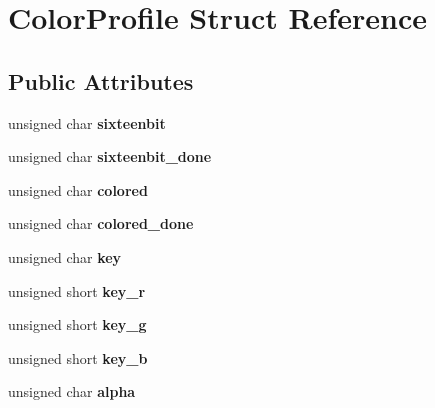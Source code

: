 \hypertarget{structColorProfile}{}\section{Color\+Profile Struct Reference}
\label{structColorProfile}
\subsection*{Public Attributes}
\begin{DoxyCompactItemize}
\item 
\hypertarget{structColorProfile_a4060733b0b18c705f404e57fe7074492}{}unsigned char {\bfseries sixteenbit}\label{structColorProfile_a4060733b0b18c705f404e57fe7074492}

\item 
\hypertarget{structColorProfile_a73c5a699599d34017e7101ae355bafce}{}unsigned char {\bfseries sixteenbit\+\_\+done}\label{structColorProfile_a73c5a699599d34017e7101ae355bafce}

\item 
\hypertarget{structColorProfile_a5473d538859f232abe8aaf864ff1548e}{}unsigned char {\bfseries colored}\label{structColorProfile_a5473d538859f232abe8aaf864ff1548e}

\item 
\hypertarget{structColorProfile_ab0c56fe33cb50929702a475288ab8e4c}{}unsigned char {\bfseries colored\+\_\+done}\label{structColorProfile_ab0c56fe33cb50929702a475288ab8e4c}

\item 
\hypertarget{structColorProfile_ac859f5252253e3e41651d4a40b3f8c07}{}unsigned char {\bfseries key}\label{structColorProfile_ac859f5252253e3e41651d4a40b3f8c07}

\item 
\hypertarget{structColorProfile_a6bcd7f7c40c3e8763a3f1185414f4932}{}unsigned short {\bfseries key\+\_\+r}\label{structColorProfile_a6bcd7f7c40c3e8763a3f1185414f4932}

\item 
\hypertarget{structColorProfile_a69145711cec524101e185425b4b34899}{}unsigned short {\bfseries key\+\_\+g}\label{structColorProfile_a69145711cec524101e185425b4b34899}

\item 
\hypertarget{structColorProfile_a5d9b7502f24a622990f2a532d2f64ac8}{}unsigned short {\bfseries key\+\_\+b}\label{structColorProfile_a5d9b7502f24a622990f2a532d2f64ac8}

\item 
\hypertarget{structColorProfile_ac2d692c039ecb5974303d8e8240367af}{}unsigned char {\bfseries alpha}\label{structColorProfile_ac2d692c039ecb5974303d8e8240367af}


\end{DoxyCompactItemize}

